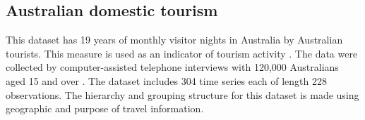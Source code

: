 \documentclass[11pt,a4paper,]{article}
\begin{document}
\hypertarget{australian-domestic-tourism}{%
\subsection{Australian domestic
tourism}\label{australian-domestic-tourism}}

This dataset has 19 years of monthly visitor nights in Australia by
Australian tourists. This measure is used as an indicator of tourism
activity \autocite{mint2018}. The data were collected by
computer-assisted telephone interviews with 120,000 Australians aged 15
and over \autocite{researchAustralia2005}. The dataset includes 304 time
series each of length 228 observations. The hierarchy and grouping
structure for this dataset is made using geographic and purpose of
travel information.

\newpage

\begingroup\fontsize{9}{11}\selectfont
\end{document}
